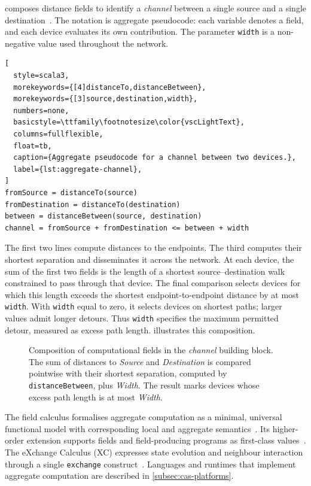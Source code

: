  composes distance fields to identify a \emph{channel} between a single source and a single destination~\cite{DBLP:journals/lmcs/PianiniCVMZ21}.
The notation is aggregate pseudocode:
each variable denotes a field,
and each device evaluates its own contribution.
The parameter \texttt{width} is a non-negative value used throughout the network.

\begin{lstlisting}[
  style=scala3,
  morekeywords={[4]distanceTo,distanceBetween},
  morekeywords={[3]source,destination,width},
  numbers=none,
  basicstyle=\ttfamily\footnotesize\color{vscLightText},
  columns=fullflexible,
  float=tb,
  caption={Aggregate pseudocode for a channel between two devices.},
  label={lst:aggregate-channel},
]
fromSource = distanceTo(source)
fromDestination = distanceTo(destination)
between = distanceBetween(source, destination)
channel = fromSource + fromDestination <= between + width
\end{lstlisting}

The first two lines compute distances to the endpoints.
The third computes their shortest separation and disseminates it across the network.
At each device,
the sum of the first two fields is the length of a shortest source--destination walk constrained to pass through that device.
The final comparison selects devices for which this length exceeds the shortest endpoint-to-endpoint distance by at most \texttt{width}.
With \texttt{width} equal to zero,
it selects devices on shortest paths;
larger values admit longer detours.
Thus \texttt{width} specifies the maximum permitted detour, measured as excess path length.
 illustrates this composition.

\begin{figure}[tb]
    \centering
    \def\svgwidth{0.65\textwidth}
    
    \caption[Composition of fields in the channel building block]{Composition of computational fields in the \emph{channel} building block. The sum of distances to \emph{Source} and \emph{Destination} is compared pointwise with their shortest separation, computed by \texttt{distanceBetween}, plus \emph{Width}. The result marks devices whose excess path length is at most \emph{Width}.}
    \label{fig:ac-blocks-composition}
\end{figure}

The field calculus formalises aggregate computation as a minimal, universal functional model with corresponding local and aggregate semantics~\cite{VIROLI2019100486}.
Its higher-order extension supports fields and field-producing programs as first-class values~\cite{AVDPB-TOCL2019}.
The eXchange Calculus (XC) expresses state evolution and neighbour interaction through a single \texttt{exchange} construct~\cite{DBLP:journals/jss/AudritoCDSV24}.
Languages and runtimes that implement aggregate computation are described in \cref{subsec:cas-platforms}.


